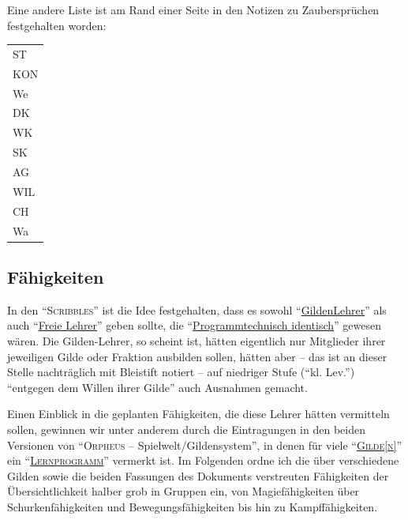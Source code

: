 \documentclass[a5paper,pagesize,numbers=noenddot]{scrbook}
\begin{document}
Eine andere Liste ist am Rand einer Seite in den Notizen zu Zaubersprüchen festgehalten worden:

\vspace{1em}
\begin{tabular}{l}
   ST    \\
   KON   \\
   We    \\
   DK    \\
   WK    \\
   SK    \\
   AG    \\
   WIL   \\
   CH    \\
   Wa    \\\hline
\end{tabular}


\subsection{Fähigkeiten}\label{sec:orpheus_mechanik_faehigkeiten}
In den \enquote{\textsc{Scribbles}} ist die Idee festgehalten, dass es sowohl \enquote{\uline{Gilden\-Lehrer}} als auch \enquote{\uline{Freie Lehrer}} geben sollte, die \enquote{\uline{Programmtechnisch identisch}} gewesen wären.
Die Gilden-Lehrer, so scheint ist, hätten eigentlich nur Mitglieder ihrer jeweiligen Gilde oder Fraktion ausbilden sollen, hätten aber -- das ist an dieser Stelle nachträglich mit Bleistift notiert -- auf niedriger Stufe (\enquote{kl. Lev.}) \enquote{entgegen dem Willen ihrer Gilde} auch Ausnahmen gemacht.\autocite[S.~15]{orpheus_b_scribbles}

Einen Einblick in die geplanten Fähigkeiten, die diese Lehrer hätten vermitteln sollen, gewinnen wir unter anderem durch die Eintragungen in den beiden Versionen von \enquote{\textsc{Orpheus} -- Spielwelt/Gildensystem}, in denen für viele \enquote{\textsc{\uline{Gilde[n]}}} ein \enquote{\textsc{\uline{Lernprogramm}}} vermerkt ist.
Im Folgenden ordne ich die über verschiedene Gilden sowie die beiden Fassungen des Dokuments verstreuten Fähigkeiten der Übersichtlichkeit halber grob in Gruppen ein, von Magiefähigkeiten über Schurkenfähigkeiten und Bewegungsfähigkeiten bis hin zu Kampffähigkeiten.
\end{document}
